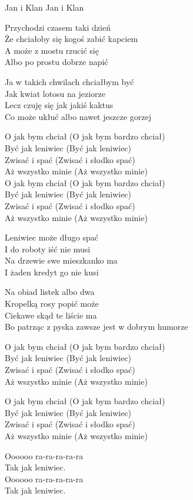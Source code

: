 {Jan i Klan}
{Jan i Klan}
\begin{text}
Przychodzi czasem taki dzień\\
Że chciałoby się kogoś zabić kapciem\\
A może z mostu rzucić się\\
Albo po prostu dobrze napić

Ja w takich chwilach chciałbym być\\
Jak kwiat lotosu na jeziorze\\
Lecz czuję się jak jakiś kaktus\\
Co może ukłuć albo nawet jeszcze gorzej

O jak bym chciał (O jak bym bardzo chciał)\\
Być jak leniwiec (Być jak leniwiec)\\
Zwisać i spać (Zwisać i słodko spać)\\
Aż wszystko minie (Aż wszystko minie)\\

O jak bym chciał (O jak bym bardzo chciał)\\
Być jak leniwiec (Być jak leniwiec)\\
Zwisać i spać (Zwisać i słodko spać)\\
Aż wszystko minie (Aż wszystko minie)

Leniwiec może długo spać\\
I do roboty iść nie musi\\
Na drzewie swe mieszkanko ma\\
I żaden kredyt go nie kusi

Na obiad listek albo dwa\\
Kropelką rosy popić może\\
Ciekawe skąd te liście ma\\
Bo patrząc z pyska zawsze jest w dobrym humorze

O jak bym chciał (O jak bym bardzo chciał)\\
Być jak leniwiec (Być jak leniwiec)\\
Zwisać i spać (Zwisać i słodko spać)\\
Aż wszystko minie (Aż wszystko minie)

O jak bym chciał (O jak bym bardzo chciał)\\
Być jak leniwiec (Być jak leniwiec)\\
Zwisać i spać (Zwisać i słodko spać)\\
Aż wszystko minie (Aż wszystko minie)

Oooooo ra-ra-ra-ra-ra\\
Tak jak leniwiec.\\
Oooooo ra-ra-ra-ra-ra\\
Tak jak leniwiec.


\end{text}
